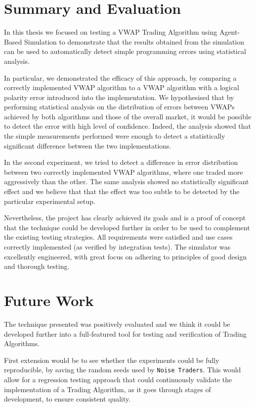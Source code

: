 \section{Summary and Evaluation}
In this thesis we focused on testing a VWAP Trading Algorithm using Agent-Based Simulation to demonstrate that the results obtained from the simulation can be used to automatically detect simple programming errors using statistical analysis.

In particular, we demonstrated the efficacy of this approach, by comparing a correctly implemented VWAP algorithm to a VWAP algorithm with a logical polarity error introduced into the implementation. We hypothesised that by performing statistical analysis on the distribution of errors between VWAPs achieved by both algorithms and those of the overall market, it would be possible to detect the error with high level of confidence. Indeed, the analysis showed that the simple measurements performed were enough to detect a statistically significant difference between the two implementations.

In the second experiment, we tried to detect a difference in error distribution between two correctly implemented VWAP algorithms, where one traded more aggressively than the other. The same analysis showed no statistically significant effect and we believe that that the effect was too subtle to be detected by the particular experimental setup.

Nevertheless, the project has clearly achieved its goals and is a proof of concept that the technique could be developed further in order to be used to complement the existing testing strategies. All requirements were satisfied and use cases correctly implemented (as verified by integration tests). The simulator was excellently engineered, with great focus on adhering to principles of good design and thorough testing. 

\section{Future Work}
\label{Chapters/Conclusions-and-Further-Work/Future-Work}
The technique presented was positively evaluated and we think it could be developed further into a full-featured tool for testing and verification of Trading Algorithms. 

First extension would be to see whether the experiments could be fully reproducible, by saving the random seeds used by \texttt{Noise Traders}. This would allow for a regression testing approach that could continuously validate the implementation of a Trading Algorithm, as it goes through stages of development, to ensure consistent quality.

